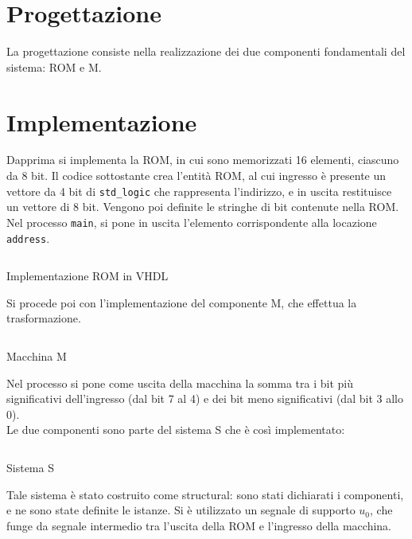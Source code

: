 \section{Progettazione}
La progettazione consiste nella realizzazione dei due componenti fondamentali del sistema: ROM e M. 
\section{Implementazione}
Dapprima si implementa la ROM, in cui sono memorizzati 16 elementi, ciascuno da 8 bit. Il codice sottostante crea l'entità ROM, al cui ingresso è presente un vettore da 4 bit di \texttt{std\_logic} che rappresenta l'indirizzo, e in uscita restituisce un vettore di 8 bit. Vengono poi definite le stringhe di bit contenute nella ROM. Nel processo \texttt{main}, si pone in uscita l'elemento corrispondente alla locazione \texttt{address}.\\
\begin{code}
    \inputminted[frame=lines, framesep=2mm, baselinestretch=1.2, bgcolor=LightGray, fontsize=\footnotesize, linenos]{vhdl}{vhdl_files/ROM.vhd}
    \caption{Implementazione ROM in VHDL}
    \label{lst:ROM}
\end{code}
Si procede poi con l'implementazione del componente M, che effettua la trasformazione.
\begin{code}
    \inputminted[frame=lines, framesep=2mm, baselinestretch=1.2, bgcolor=LightGray, fontsize=\footnotesize, linenos]{vhdl}{vhdl_files/M.vhd}
    \caption{Macchina M}
    \label{lst:M}
\end{code}
Nel processo si pone come uscita della macchina la somma tra i bit più significativi dell'ingresso (dal bit 7 al 4) e dei bit meno significativi (dal bit 3 allo 0).\\
Le due componenti sono parte del sistema S che è così implementato:
\begin{code}
    \inputminted[frame=lines, framesep=2mm, baselinestretch=1.2, bgcolor=LightGray, fontsize=\footnotesize, linenos]{vhdl}{vhdl_files/ROMplusM.vhd}
    \caption{Sistema S}
    \label{lst:S}
\end{code}
Tale sistema è stato costruito come structural: sono stati dichiarati i componenti, e ne sono state definite le istanze. Si è utilizzato un segnale di supporto $u_0$, che funge da segnale intermedio tra l'uscita della ROM e l'ingresso della macchina. \\
